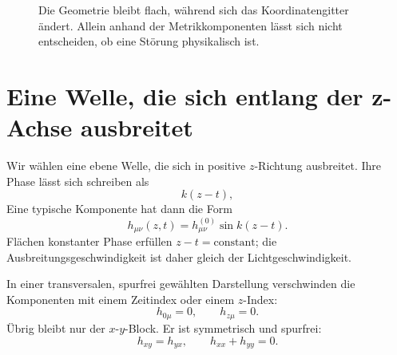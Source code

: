 \begin{figure}[htbp]
\centering
{}
\caption{Die Geometrie bleibt flach, während sich das Koordinatengitter ändert. Allein anhand der Metrikkomponenten lässt sich nicht entscheiden, ob eine Störung physikalisch ist.}
\end{figure}

\section{Eine Welle, die sich entlang der z-Achse ausbreitet}

Wir wählen eine ebene Welle, die sich in positive \(z\)-Richtung ausbreitet. Ihre Phase lässt sich schreiben als
\begin{equation}
 k(z-t),
\end{equation}
Eine typische Komponente hat dann die Form
\begin{equation}
 h_{\mu\nu}(z,t)
 =h_{\mu\nu}^{(0)}\sin k(z-t).
 \label{eq:plane-wave}
\end{equation}
Flächen konstanter Phase erfüllen \(z-t=\text{constant}\); die Ausbreitungsgeschwindigkeit ist daher gleich der Lichtgeschwindigkeit.

In einer transversalen, spurfrei gewählten Darstellung verschwinden die Komponenten mit einem Zeitindex oder einem \(z\)-Index:
\begin{equation}
 h_{0\mu}=0,
 \qquad
 h_{z\mu}=0.
 \label{eq:tt-transverse}
\end{equation}
Übrig bleibt nur der \(x\)-\(y\)-Block. Er ist symmetrisch und spurfrei:
\begin{equation}
 h_{xy}=h_{yx},
 \qquad
 h_{xx}+h_{yy}=0.
 \label{eq:tt-trace}
\end{equation}

